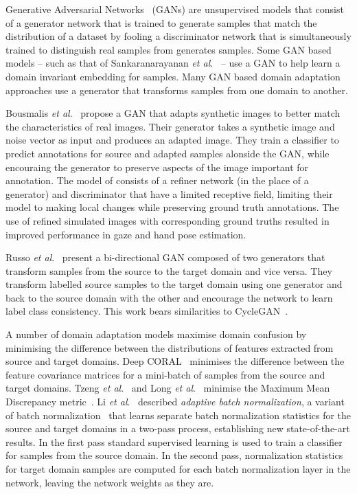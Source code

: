 \documentclass{article}
\newcommand{\etal}{\textit{et al}.}
\begin{document}
Generative Adversarial Networks~\cite{Goodfellow:GANs} (GANs) are unsupervised models that consist of a generator network that is trained to generate samples that match the distribution of a dataset by fooling a discriminator network that is simultaneously trained to distinguish real samples from generates samples. Some GAN based models -- such as that of Sankaranarayanan \etal~\cite{Sankaranarayanan:GANAdapt} -- use a GAN to help learn a domain invariant embedding for samples. Many GAN based domain adaptation approaches use a generator that transforms samples from one domain to another.

Bousmalis \etal~\cite{Bousmalis:UnsupPixDomGAN} propose a GAN that adapts synthetic images to better match the characteristics of real images. Their generator takes a synthetic image and noise vector as input and produces an adapted image. They train a classifier to predict annotations for source and adapted samples alonside the GAN, while encouraing the generator to preserve aspects of the image important for annotation. The model of \cite{Shrivastava:LearnSimUnsup} consists of a refiner network (in the place of a generator) and discriminator that have a limited receptive field, limiting their model to making local changes while preserving ground truth annotations. The use of refined simulated images with corresponding ground truths resulted in improved performance in gaze and hand pose estimation.

Russo \etal~\cite{Russo:SBADAGAN} present a bi-directional GAN composed of two generators that transform samples from the source to the target domain and vice versa. They transform labelled source samples to the target domain using one generator and back to the source domain with the other and encourage the network to learn label class consistency. This work bears similarities to CycleGAN~\cite{Zhu:CycleGAN}.

A number of domain adaptation models maximise domain confusion by minimising the difference between the distributions of features extracted from source and target domains. Deep CORAL~\cite{Sun:DeepCORAL} minimises the difference between the feature covariance matrices for a mini-batch of samples from the source and target domains. Tzeng \etal~\cite{Tzeng:DomConf} and Long \etal~\cite{Long:DAN} minimise the Maximum Mean Discrepancy metric~\cite{Gretton:Kernel}. Li \etal~\cite{Li:AdaBN} described \emph{adaptive batch normalization}, a variant of batch normalization~\cite{Ioffe:BatchNorm} that learns separate batch normalization statistics for the source and target domains in a two-pass process, establishing new state-of-the-art results. In the first pass standard supervised learning is used to train a classifier for samples from the source domain. In the second pass, normalization statistics for target domain samples are computed for each batch normalization layer in the network, leaving the network weights as they are.
\end{document}
